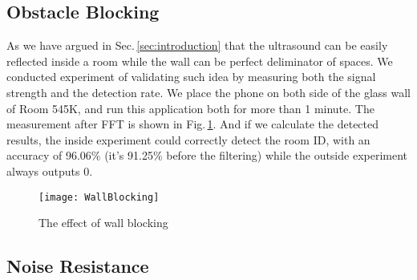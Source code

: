 \subsection{Obstacle Blocking}
\label{sec:obstacle-blocking}
As we have argued in Sec.\,\ref{sec:introduction} that the ultrasound can be easily reflected inside a room while the wall can be perfect deliminator of spaces. We conducted experiment of validating such idea by measuring both the signal strength and the detection rate. We place the phone on both side of the glass wall of Room 545K, and run this application both for more than 1 minute. The measurement after FFT is shown in Fig.\,\ref{fig:wallblock}. And if we calculate the detected results, the inside experiment could correctly detect the room ID, with an accuracy of 96.06\% (it's 91.25\% before the filtering) while the outside experiment always outputs 0.

\begin{figure}
  \centering
  \texttt{[image: WallBlocking]}
  \vspace{-0.3cm}
  \caption{The effect of wall blocking}
  \label{fig:wallblock}
\end{figure}

\subsection{Noise Resistance}
\label{sec:noise-resistance}



